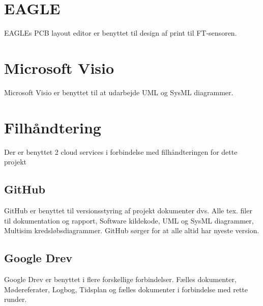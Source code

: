 \section{EAGLE}
EAGLEs PCB layout editor er benyttet til design af print til FT-sensoren.

\section{Microsoft Visio}
Microsoft Visio er benyttet til at udarbejde UML og SysML diagrammer. 

\section{Filhåndtering}
Der er benyttet 2 cloud services i forbindelse med filhåndteringen for dette projekt

\subsection{GitHub}
GitHub er benyttet til versionsstyring af projekt dokumenter dvs. Alle tex. filer til dokumentation og rapport, Software kildekode, UML og SysML diagrammer, Multisim kredsløbsdiagrammer. GitHub sørger for at alle altid har nyeste version. 

\subsection{Google Drev}
Google Drev er benyttet i flere forskellige forbindelser. Fælles dokumenter, Mødereferater, Logbog, Tidsplan og fælles dokumenter i forbindelse med rette runder.


